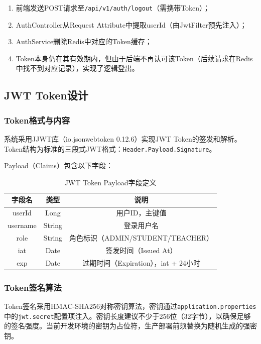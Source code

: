 \documentclass{../../softeng}
\begin{document}
\begin{enumerate}
    \item 前端发送POST请求至\verb|/api/v1/auth/logout|（需携带Token）；
    \item AuthController从Request Attribute中提取userId（由JwtFilter预先注入）；
    \item AuthService删除Redis中对应的Token缓存；
    \item Token本身仍在其有效期内，但由于后端不再认可该Token（后续请求在Redis中找不到对应记录），实现了逻辑登出。
\end{enumerate}

\subsection{JWT Token设计}

\subsubsection{Token格式与内容}

系统采用JJWT库（io.jsonwebtoken 0.12.6）实现JWT Token的签发和解析。Token结构为标准的三段式JWT格式：\verb|Header.Payload.Signature|。

Payload（Claims）包含以下字段：

\begin{table}[htbp]
    \centering
    \caption{JWT Token Payload字段定义}
    \begin{tabular}{|c|c|c|}
        \hline
        \textbf{字段名} & \textbf{类型} & \textbf{说明} \\
        \hline
        userId & Long & 用户ID，主键值 \\
        \hline
        username & String & 登录用户名 \\
        \hline
        role & String & 角色标识（ADMIN/STUDENT/TEACHER） \\
        \hline
        iat & Date & 签发时间（Issued At） \\
        \hline
        exp & Date & 过期时间（Expiration），iat + 24小时 \\
        \hline
    \end{tabular}
\end{table}

\subsubsection{Token签名算法}

Token签名采用HMAC-SHA256对称密钥算法，密钥通过\verb|application.properties|中的\verb|jwt.secret|配置项注入。密钥长度建议不少于256位（32字节），以确保足够的签名强度。当前开发环境的密钥为占位符，生产部署前须替换为随机生成的强密钥。
\end{document}
